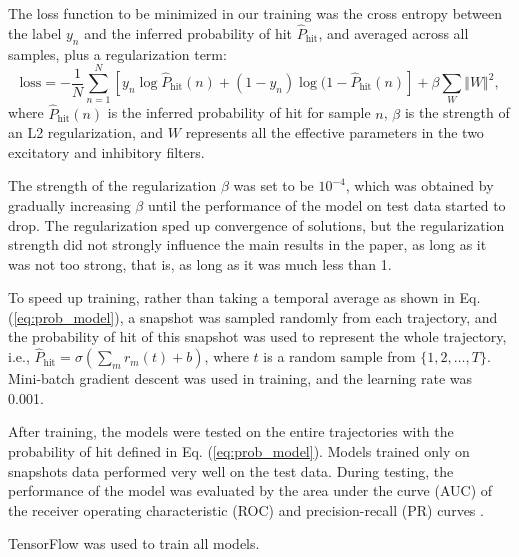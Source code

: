 \documentclass[pdftex,9pt,lineno]{elife}
\let\hat\widehat
\begin{document}
The loss function to be minimized in our training was the cross entropy between the label $y_{n}$ and the inferred probability of hit $\hat{P}_{\text{hit}}$, and averaged across all samples, plus a regularization term:
\begin{equation}
\text{loss}=-\frac{1}{N}\sum_{n=1}^{N}\left[ y_{n}\log \hat{P}_{\text{hit}}(n)+(1-y_{n})\log (1-\hat{P}_{\text{hit}}(n) \right]+\beta\sum_{W}\Vert W \Vert^{2},
\end{equation}
where $\hat{P}_{\text{hit}}(n)$ is the inferred probability of hit for sample $n$, $\beta$ is the strength of an L2 regularization, and $W$ represents all the effective parameters in the two excitatory and inhibitory filters.

The strength of the regularization $\beta$ was set to be $10^{-4}$, which was obtained by gradually increasing $\beta$ until the performance of the model on test data started to drop. The regularization sped up convergence of solutions, but the regularization strength did not strongly influence the main results in the paper, as long as it was not too strong, that is, as long as it was much less than 1.

To speed up training, rather than taking a temporal average as shown in Eq. (\ref{eq:prob_model}), a snapshot was sampled randomly from each trajectory, and the probability of hit of this snapshot was used to represent the whole trajectory, i.e., $\hat{P}_{\text{hit}}=\sigma \left( \sum_{m}r_{m}(t)+b \right)$, where $t$ is a random sample from $\{1,2,\dots,T\}$. Mini-batch gradient descent was used in training, and the learning rate was 0.001.

After training, the models were tested on the entire trajectories with the probability of hit defined in Eq. (\ref{eq:prob_model}). Models trained only on snapshots data performed very well on the test data. During testing, the performance of the model was evaluated by the area under the curve (AUC) of the receiver operating characteristic (ROC) and precision-recall (PR) curves \citep{hanley1982meaning,davis2006relationship}.



TensorFlow \citep{abadi2016tensorflow} was used to train all models.
\end{document}
